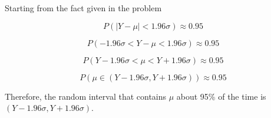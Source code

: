 Starting from the fact given in the problem

$$
P(|Y - \mu| < 1.96\sigma) \approx 0.95
$$

$$
P(-1.96\sigma < Y-\mu < 1.96\sigma) \approx 0.95
$$

$$
P(Y - 1.96\sigma < \mu < Y + 1.96\sigma) \approx 0.95
$$

$$
P(\mu \in (Y-1.96\sigma,Y+1.96\sigma)) \approx 0.95
$$

Therefore, the random interval that contains $\mu$ about 95\% of the time is $(Y-1.96\sigma,Y+1.96\sigma)$.
